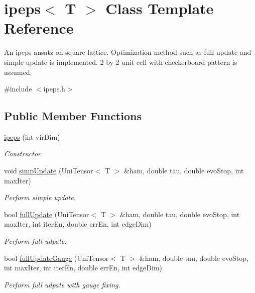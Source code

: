 \hypertarget{classipeps}{}\section{ipeps$<$ T $>$ Class Template Reference}
\label{classipeps}


An ipeps ansatz on square lattice. Optimization method such as full update and simple update is implemented. 2 by 2 unit cell with checkerboard pattern is assumed.  




{\ttfamily \#include $<$ipeps.\+h$>$}

\subsection*{Public Member Functions}
\begin{DoxyCompactItemize}
\item 
\hyperlink{classipeps_aa9ca488a31081cc0cf3cd29b495ec729}{ipeps} (int vir\+Dim)
\begin{DoxyCompactList}\small\item\em Constructor. \end{DoxyCompactList}\item 
void \hyperlink{classipeps_aa98bdc6097f41fc3dad78b7099088218}{simp\+Update} (Uni\+Tensor$<$ T $>$ \&ham, double tau, double evo\+Stop, int max\+Iter)
\begin{DoxyCompactList}\small\item\em Perform simple update. \end{DoxyCompactList}\item 
bool \hyperlink{classipeps_aee4f9d4f792368ca4ebc9fe1bcfa6a10}{full\+Update} (Uni\+Tensor$<$ T $>$ \&ham, double tau, double evo\+Stop, int max\+Iter, int iter\+En, double err\+En, int edge\+Dim)
\begin{DoxyCompactList}\small\item\em Perform full udpate. \end{DoxyCompactList}\item 
bool \hyperlink{classipeps_a6e5a0a36d56e201f5d83b10834c92997}{full\+Update\+Gauge} (Uni\+Tensor$<$ T $>$ \&ham, double tau, double evo\+Stop, int max\+Iter, int iter\+En, double err\+En, int edge\+Dim)
\begin{DoxyCompactList}\small\item\em Perform full udpate with gauge fixing. \end{DoxyCompactList}\item 

\end{DoxyCompactItemize}
